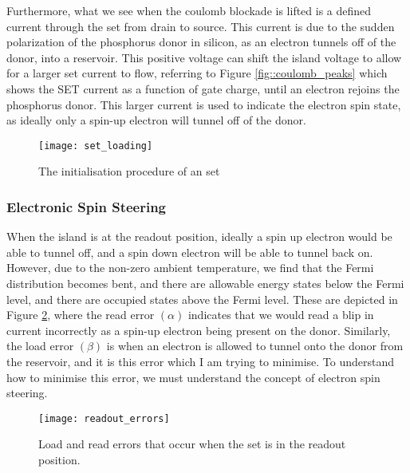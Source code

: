 Furthermore, what we see when the coulomb blockade is lifted is a defined current through the \gls{set} from drain to source. This current is due to the sudden polarization of the phosphorus donor in silicon, as an electron tunnels off of the donor, into a reservoir. This positive voltage can shift the island voltage to allow for a larger \gls{set} current to flow, referring to Figure \ref{fig::coulomb_peaks} which shows the SET current as a function of gate charge, until an electron rejoins the phosphorus donor. This larger current is used to indicate the electron spin state, as ideally only a spin-up electron will tunnel off of the donor.

\begin{figure}[htbp!]
	\centering
	\texttt{[image: set\_loading]}
	\caption{The initialisation procedure of an \gls{set}\cite{morello2010single}}
	\label{fig::set_loading}
\end{figure}


\subsubsection{Electronic Spin Steering}

When the island is at the readout position, ideally a spin up electron would be able to tunnel off, and a spin down electron will be able to tunnel back on. However, due to the non-zero ambient temperature, we find that the Fermi distribution becomes bent, and there are allowable energy states below the Fermi level, and there are occupied states above the Fermi level. These are depicted in Figure \ref{fig::errors}, where the read error $(\alpha)$ indicates that we would read a blip in current incorrectly as a spin-up electron being present on the donor. Similarly, the load error $(\beta)$ is when an electron is allowed to tunnel onto the donor from the reservoir, and it is this error which I am trying to minimise. To understand how to minimise this error, we must understand the concept of electron spin steering.

\begin{figure}[htbp!]
	\centering
	\texttt{[image: readout\_errors]}
	\caption{Load and read errors that occur when the \gls{set} is in the readout position.\cite{electron_spin_silicon}}
	\label{fig::errors}
\end{figure}



